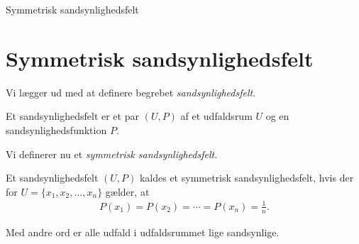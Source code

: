 \documentclass[12pt]{article}
\begin{document}


\begin{center}
\Huge
Symmetrisk sandsynlighedsfelt
\end{center}
\section*{Symmetrisk sandsynlighedsfelt}

Vi lægger ud med at definere begrebet \textit{sandsynlighedsfelt}.

\begin{defn}[Sandsynlighedsfelt]
	Et sandsynlighedsfelt er et par $(U,P)$ af et udfaldsrum $U$ og en sandsynlighedsfunktion $P$.  
\end{defn}

Vi definerer nu et \textit{symmetrisk sandsynlighedsfelt}.
\begin{defn}
	Et sandsynlighedsfelt $(U,P)$ kaldes et symmetrisk sandsynlighedsfelt, hvis der for $U = \{ x_1, x_2,\hdots, x_n\}$ gælder, at 
	\begin{align*}
		P(x_1) = P(x_2) =\cdots = P(x_n) = \frac{1}{n}.
	\end{align*}
\end{defn}
Med andre ord er alle udfald i udfaldsrummet lige sandsynlige. 
\end{document}
